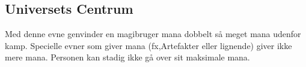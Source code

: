 \subsection{Universets Centrum}

Med denne evne genvinder en magibruger mana dobbelt så meget mana udenfor kamp. Specielle evner som giver mana (fx,Artefakter eller lignende) giver ikke mere mana. Personen kan stadig ikke gå over sit maksimale mana.
